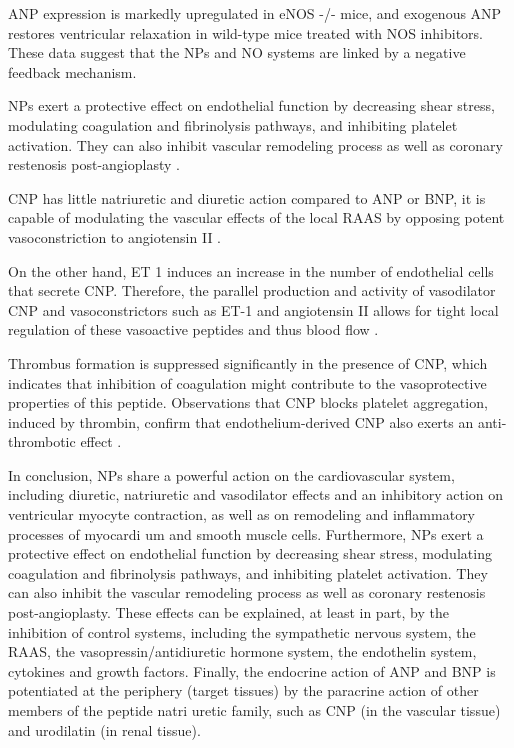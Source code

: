 \documentclass[14pt,a4paper,onecolumn]{extarticle}
\begin{document}
ANP expression is markedly upregulated in eNOS -/- mice, and exogenous ANP restores ventricular relaxation in wild-type mice treated with NOS inhibitors. These data suggest that the NPs and NO systems are linked by a negative feedback mechanism.  \citep{118}

NPs exert a protective effect on endothelial function by decreasing shear stress, modulating coagulation and fibrinolysis pathways, and inhibiting platelet activation. They can also inhibit vascular remodeling process as well as coronary restenosis post-angioplasty \citep{89}.

CNP has little natriuretic and diuretic action compared to ANP or BNP, it is capable of modulating the vascular effects of the local RAAS by opposing potent vasoconstriction to angiotensin II \citep{269}.

On the other hand, ET 1 induces an increase in the number of endothelial cells that secrete CNP. Therefore, the parallel production and activity of vasodilator CNP and vasoconstrictors such as ET-1 and angiotensin II allows for tight local regulation of these vasoactive peptides and thus blood flow \citep{279}.

Thrombus formation is suppressed significantly in the presence of CNP, which indicates that inhibition of coagulation might contribute to the vasoprotective properties of this peptide. Observations that CNP blocks platelet aggregation, induced by thrombin, confirm that endothelium-derived CNP also exerts an anti-thrombotic effect \citep{267}. %

In conclusion, NPs share a powerful action on the cardiovascular system, including diuretic, natriuretic and vasodilator effects and an inhibitory action on ventricular myocyte contraction, as well as on remodeling and inflammatory processes of myocardi um and smooth muscle cells. Furthermore, NPs exert a protective effect on endothelial function by decreasing shear stress, modulating coagulation and fibrinolysis pathways, and inhibiting platelet activation. They can also inhibit the vascular remodeling process as well as coronary restenosis post-angioplasty. These effects can be explained, at least in part, by the inhibition of control systems, including the sympathetic nervous system, the RAAS, the vasopressin/antidiuretic hormone system, the endothelin system, cytokines and growth factors. Finally, the endocrine action of ANP and BNP is potentiated at the periphery (target tissues) by the paracrine action of other members of the peptide natri uretic family, such as CNP (in the vascular tissue) and urodilatin (in renal tissue).
\end{document}
